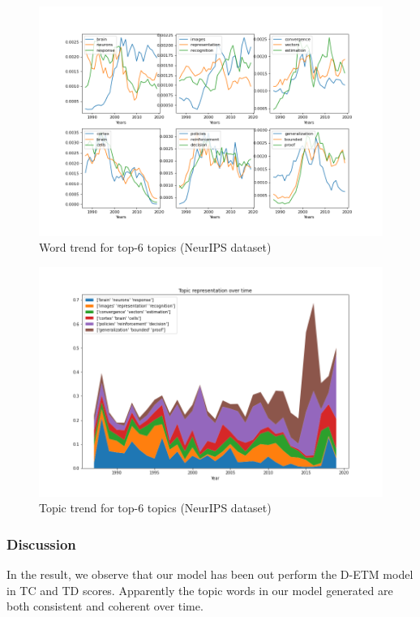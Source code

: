 \begin{figure}
\centering
\includegraphics[width=1\linewidth]{figures/1128/scatter(2)}
\caption{Word trend for top-6 topics (NeurIPS dataset)}
\label{fig:scatter2}
\end{figure}
\begin{figure}
\centering
\includegraphics[width=1\linewidth]{figures/1128/stack(2)}
\caption{Topic trend for top-6 topics (NeurIPS dataset)}
\label{fig:stack2}
\end{figure}
\subsubsection{Discussion}
In the result, we observe that our model has been out perform the D-ETM model in TC and TD scores. Apparently the topic words in our model generated are both consistent  and coherent over time.